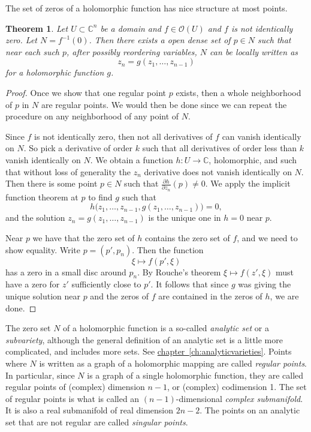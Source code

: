 \documentclass[12pt,openany]{book}
\newcommand{\C}{{\mathbb{C}}}
\newcommand{\sO}{{\mathscr{O}}}
\newcommand{\myindex}[1]{#1\index{#1}}
\theoremstyle{plain}
\newtheorem{thm}{Theorem}[section]
\theoremstyle{remark}
\theoremstyle{definition}
\theoremstyle{exercise}
\theoremstyle{example}
\newcommand{\chapterref}[1]{\hyperref[#1]{chapter~\ref*{#1}}}
\begin{document}
The set of zeros of a holomorphic function has nice structure at most
points.

\begin{thm} \label{thm:regptsdense}
Let $U \subset \C^n$ be a domain and
$f \in \sO(U)$ and $f$ is not identically zero.
Let $N = f^{-1}(0)$.  Then there exists a open dense set of $p \in N$
such that near each such $p$, after possibly reordering variables,
$N$ can be locally written as
\begin{equation*}
z_n = g(z_1,\ldots,z_{n-1})
\end{equation*}
for a holomorphic function $g$.
\end{thm}

\begin{proof}
Once we show that one regular point $p$ exists, then a whole
neighborhood of $p$ in $N$ are regular points.  We would then be done
since we can
repeat the procedure on any neighborhood of any point of $N$.

Since $f$ is not identically zero, then not all derivatives of $f$
can vanish identically on $N$.  So pick a derivative of order $k$
such that all derivatives of order less than $k$ vanish identically on $N$.
We obtain a function $h \colon U \to \C$, holomorphic, and such that 
without loss of generality the $z_n$ derivative does not vanish identically
on $N$.  Then there is some point $p \in N$ such that $\frac{\partial
h}{\partial z_n}(p) \not= 0$.
We apply the implicit function theorem at $p$ to find $g$ such that
\begin{equation*}
h\bigr(z_1,\ldots,z_{n-1},g(z_1,\ldots,z_{n-1})\bigr) = 0 ,
\end{equation*}
and the solution $z_n = g(z_1,\ldots,z_{n-1})$ is the unique one
in $h=0$ near $p$.

Near $p$ we have that the zero set of $h$ contains the zero set of $f$, and
we need to show equality.
Write $p = (p',p_n)$.  Then the function
\begin{equation*}
\xi \mapsto f(p',\xi)
\end{equation*}
has a zero in a small disc around $p_n$.  By Rouche's theorem
$\xi \mapsto f(z',\xi)$ must have a zero for $z'$ sufficiently close to $p'$.
It follows that since $g$ was giving the unique solution near $p$ and the
zeros of $f$ are contained in the zeros of $h$, we are done.
\end{proof}

The zero set $N$ of a holomorphic function is a so-called
\emph{\myindex{analytic set}} or a \emph{\myindex{subvariety}},
although the general definition of an
analytic set is a little more complicated, and includes more sets.
See \chapterref{ch:analyticvarieties}.
Points where $N$ is written as a graph of a holomorphic mapping are called
\emph{regular points}.  In particular,
since $N$ is a graph of a single holomorphic function, they are called
regular points of (complex) dimension $n-1$, or (complex) codimension 1.
The set of regular points is what is called an
$(n-1)$-dimensional \emph{\myindex{complex submanifold}}.  It is also a real
submanifold of real dimension $2n-2$.
The points on an analytic set that are not regular are called
\emph{singular points}.
\end{document}
